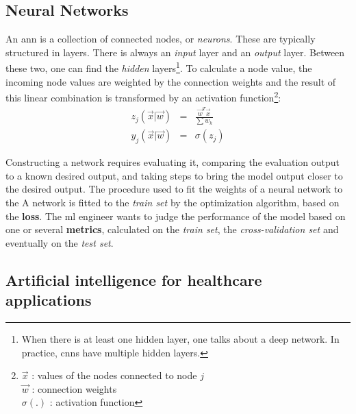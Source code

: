 \subsection{Neural Networks}
\par{
    An \acrshort{ann} is a collection of connected nodes, or \textit{neurons}. 
    These are typically structured in layers. 
    There is always an \textit{input} layer and an \textit{output} layer. Between these two, one can find the \textit{hidden} layers\footnote{When there is at least one hidden layer, one talks about a deep network. In practice, \acrshort{cnn}s have multiple hidden layers.}.
    To calculate a node value, the incoming node values are weighted by the connection weights and the result of this linear combination is transformed by an activation function\footnote{
        $\vec{x}$ : values of the nodes connected to node $j$\\
        $\vec{w}$ : connection weights\\
        $\sigma(.)$ : activation function
    }:
    \begin{eqnarray}
        z_j(\vec{x} | \vec{w}) &=& \frac{\vec{w}^T\vec{x}}{\sum w_k} \\
        y_j(\vec{x} | \vec{w}) &=& \sigma(z_j)
    \end{eqnarray}
}

\par{
    Constructing a network requires evaluating it, comparing the evaluation output to a known desired output, and taking steps to bring the model output closer to the desired output. 
    The procedure used to fit the weights of a neural network to the 
    A network is fitted to the \textit{train set} by the optimization algorithm, based on the \textbf{loss}.
    The \acrshort{ml} engineer wants to judge the performance of the model based on one or several \textbf{metrics}, calculated on the \textit{train set}, the \textit{cross-validation set} and eventually on the \textit{test set}.
}

\subsection{Artificial intelligence for healthcare applications}

